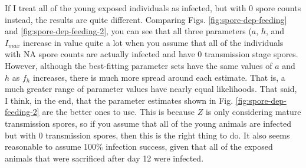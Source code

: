 \documentclass[12pt,reqno,final,pdftex]{amsart}\usepackage[]{graphicx}\usepackage[]{color}
\theoremstyle{plain}
\numberwithin{equation}{part}
\begin{document}
If I treat all of the young exposed individuals as infected, but with 0 spore counts instead, the results are quite different.
Comparing Figs. \ref{fig:spore-dep-feeding} and \ref{fig:spore-dep-feeding-2}, you can see that all three parameters ($a$, $h$, and $I_{max}$ increase in value quite a lot when you assume that all of the individuals with NA spore counts are actually infected and have 0 transmission stage spores.
However, although the best-fitting parameter sets have the same values of $a$ and $h$ as $f_h$ increases, there is much more spread around each estimate.
That is, a much greater range of parameter values have nearly equal likelihoods.
That said, I think, in the end, that the parameter estimates shown in Fig. \ref{fig:spore-dep-feeding-2} are the better ones to use.
This is because $Z$ is only considering mature transmission spores, so if you assume that all of the young animals are infected but with 0 transmission spores, then this is the right thing to do.
It also seems reasonable to assume 100\% infection success, given that all of the exposed animals that were sacrificed after day 12 were infected.
\end{document}

